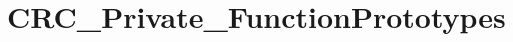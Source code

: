 \hypertarget{group___c_r_c___private___function_prototypes}{\section{C\-R\-C\-\_\-\-Private\-\_\-\-Function\-Prototypes}
\label{group___c_r_c___private___function_prototypes}
}
